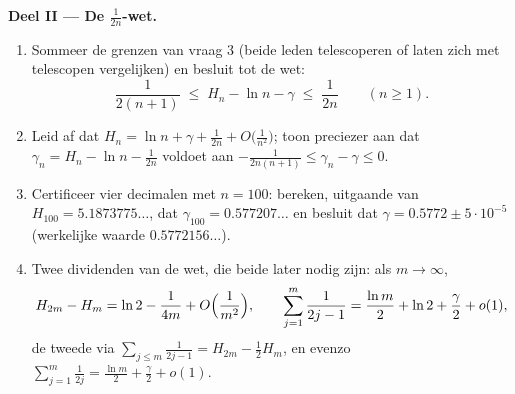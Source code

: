 \begin{problem}[{Weekendopgave --- $H_n = \ln n + \gamma +
\frac{1}{2n} + O(n^{-2})$, en het herschikken van $1 - \frac12 +
\frac13 - \dots$ tot $\frac{\ln 2}{2}$}]
\medskip
\noindent\textbf{Deel II --- De $\frac{1}{2n}$-wet.}
\begin{enumerate}[resume]
  \item Sommeer de grenzen van vraag 3 (beide leden telescoperen of
        laten zich met telescopen vergelijken) en besluit tot de
        wet:
        \[
        \frac{1}{2(n+1)} \;\leq\; H_n - \ln n - \gamma \;\leq\;
        \frac{1}{2n} \qquad (n \geq 1).
        \]
  \item Leid af dat $H_n = \ln n + \gamma + \frac{1}{2n} +
        O\bigl(\frac{1}{n^2}\bigr)$; toon preciezer aan dat
        $\gamma_n = H_n - \ln n - \frac{1}{2n}$ voldoet aan
        $-\frac{1}{2n(n+1)} \leq \gamma_n - \gamma \leq 0$.
  \item Certificeer vier decimalen met $n = 100$: bereken,
        uitgaande van $H_{100} = 5.1873775\dots$, dat
        $\gamma_{100} = 0.577207\dots$ en besluit dat $\gamma =
        0.5772 \pm 5\cdot10^{-5}$ (werkelijke waarde
        $0.5772156\dots$).
  \item Twee dividenden van de wet, die beide later nodig zijn:
        als $m \to \infty$,
        \[
        H_{2m} - H_m = \ln 2 - \frac{1}{4m} +
        O\Bigl(\frac{1}{m^2}\Bigr),
        \qquad
        \sum_{j=1}^{m} \frac{1}{2j-1} = \frac{\ln m}{2} + \ln 2
        + \frac\gamma2 + o(1) ,
        \]
        de tweede via $\sum_{j \leq m} \frac{1}{2j-1} = H_{2m} -
        \frac12 H_m$, en evenzo $\sum_{j=1}^{m} \frac{1}{2j} =
        \frac{\ln m}{2} + \frac\gamma2 + o(1)$.
\end{enumerate}


\end{problem}
